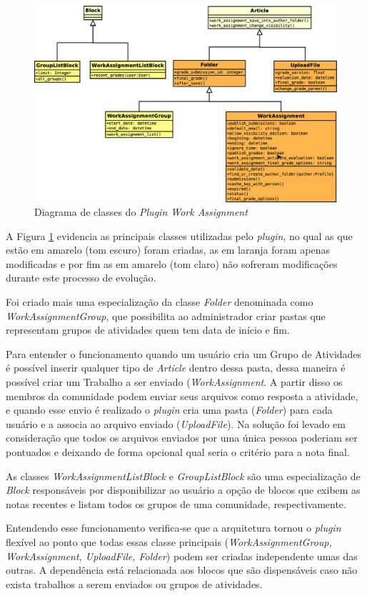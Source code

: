\begin{figure}[h]
    \centering
    \includegraphics[keepaspectratio=true,scale=0.3]
      {figuras/diagramaUMLCompletoColor.eps}
    \caption{Diagrama de classes do \textit{Plugin Work Assignment}}
    \label{fig:arquitetura-work}
\end{figure}

A Figura \ref{fig:arquitetura-work} evidencia as principais classes utilizadas pelo \textit{plugin}, no qual as que estão em amarelo (tom escuro) foram criadas, as em laranja foram apenas modificadas e por fim as em amarelo (tom claro) não sofreram modificações durante este processo de evolução.

Foi criado mais uma especialização da classe \textit{Folder} denominada como \textit{WorkAssignmentGroup}, que possibilita ao administrador criar pastas que representam grupos de atividades quem tem data de início e fim.

Para entender o funcionamento quando um usuário cria um Grupo de Atividades é possível inserir qualquer tipo de \textit{Article} dentro dessa pasta, dessa maneira é possível criar um Trabalho a ser enviado (\textit{WorkAssignment}. A partir disso os membros da comunidade podem enviar seus arquivos como resposta a atividade, e quando esse envio é realizado o \textit{plugin} cria uma pasta (\textit{Folder}) para cada usuário e a associa ao arquivo enviado (\textit{UploadFile}). Na solução foi levado em consideração que todos os arquivos enviados por uma única pessoa poderiam ser pontuados e deixando de forma opcional qual seria o critério para a nota final.

As classes \textit{WorkAssignmentListBlock} e \textit{GroupListBlock} são uma especialização de \textit{Block} responsáveis por disponibilizar ao usuário a opção de blocos que exibem as notas recentes e listam todos os grupos de uma comunidade, respectivamente.

Entendendo esse funcionamento verifica-se que a arquitetura tornou o \textit{plugin} flexível ao ponto que todas essas classe principais (\textit{WorkAssignmentGroup, WorkAssignment, UploadFile, Folder}) podem ser criadas independente umas das outras. A dependência está relacionada aos blocos que são dispensáveis caso não exista trabalhos a serem enviados ou grupos de atividades.

